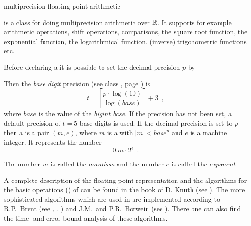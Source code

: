 
\newcommand{\base}{\mathit{base}}



\NAME

 \dotfill multiprecision floating point arithmetic



\ABSTRACT

 is a class for doing multiprecision arithmetic over $\mathbb{R}$.  It supports for
example arithmetic operations, shift operations, comparisons, the square root function, the
exponential function, the logarithmical function, (inverse) trigonometric functions etc.



\DESCRIPTION

Before declaring a  it is possible to set the decimal precision $p$ by

\begin{quote}
\end{quote}

Then the \emph{base digit} precision (see class , page \pageref{class:bigint}) is
\begin{displaymath}
  t = \left\lceil\frac{p \cdot \log(10)}{\log(\base)}\right\rceil + 3 \enspace ,
\end{displaymath}
where $\base$ is the value of the \emph{bigint base}.  If the precision has not been set, a
default precision of $t = 5$  base digits is used.  If the decimal precision is set
to $p$ then a  is a pair $(m, e)$, where $m$ is a  with $|m| <
\base^p$ and $e$ is a machine integer.  It represents the number
\begin{displaymath}
  0.m \cdot 2^e \enspace.
\end{displaymath}

The number $m$ is called the \emph{mantissa} and the number $e$ is called the \emph{exponent}.

A complete description of the floating point representation and the algorithms for the basic
operations (\code{+, -, *, /}) of  can be found in the book of D. Knuth (see
\cite{Knuth_2:1981}).  The more sophisticated algorithms which are used in  are
implemented according to R.P.~Brent (see \cite{Brent:1976b}, \cite{Brent/McMillan:1980},
\cite{Brent:1976c}) and J.M.~and P.B.~Borwein (see \cite{BorweinJM/BorweinPB:1987}).  There one
can also find the time- and error-bound analysis of these algorithms.



